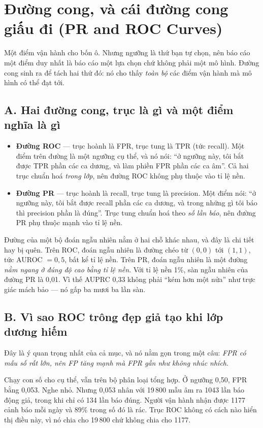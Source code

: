 \documentclass[../../deep_learning.tex]{subfiles}
\begin{document}
\section{Đường cong, và cái đường cong giấu đi (PR and ROC Curves)}
Một điểm vận hành cho bốn ô. Nhưng ngưỡng là thứ bạn tự chọn, nên báo cáo một điểm duy nhất là báo cáo một lựa chọn chứ không phải một mô hình. Đường cong sinh ra để tách hai thứ đó: nó cho thấy \emph{toàn bộ} các điểm vận hành mà mô hình có thể đạt tới.

\subsection{A. Hai đường cong, trục là gì và một điểm nghĩa là gì}
\begin{itemize}
\item \textbf{Đường ROC} --- trục hoành là FPR, trục tung là TPR (tức recall). Một điểm trên đường là một ngưỡng cụ thể, và nó nói: ``ở ngưỡng này, tôi bắt được TPR phần các ca dương, và làm phiền FPR phần các ca âm''. Cả hai trục chuẩn hoá \emph{trong lớp}, nên đường ROC không phụ thuộc vào tỉ lệ nền.
\item \textbf{Đường PR} --- trục hoành là recall, trục tung là precision. Một điểm nói: ``ở ngưỡng này, tôi bắt được recall phần các ca dương, và trong những gì tôi báo thì precision phần là đúng''. Trục tung chuẩn hoá theo \emph{số lần báo}, nên đường PR phụ thuộc mạnh vào tỉ lệ nền.
\end{itemize}

Đường của một bộ đoán ngẫu nhiên nằm ở hai chỗ khác nhau, và đây là chi tiết hay bị quên. Trên ROC, đoán ngẫu nhiên là đường chéo từ \((0,0)\) tới \((1,1)\), tức AUROC \(= 0{,}5\), bất kể tỉ lệ nền. Trên PR, đoán ngẫu nhiên là một đường \emph{nằm ngang ở đúng độ cao bằng tỉ lệ nền}. Với tỉ lệ nền 1\%, sàn ngẫu nhiên của đường PR là 0{,}01. Vì thế AUPRC 0{,}33 không phải ``kém hơn một nửa'' như trực giác mách bảo --- nó gấp ba mươi ba lần sàn.

\subsection{B. Vì sao ROC trông đẹp giả tạo khi lớp dương hiếm}
Đây là ý quan trọng nhất của cả mục, và nó nằm gọn trong một câu: \emph{FPR có mẫu số rất lớn, nên FP tăng mạnh mà FPR gần như không nhúc nhích}.

Chạy con số cho cụ thể, vẫn trên bộ phân loại tổng hợp. Ở ngưỡng 0{,}50, FPR bằng 0{,}053. Nghe nhỏ. Nhưng 0{,}053 nhân với 19\,800 mẫu âm ra 1043 lần báo động giả, trong khi chỉ có 134 lần báo đúng. Người vận hành nhận được 1177 cảnh báo mỗi ngày và 89\% trong số đó là rác. Trục ROC không có cách nào hiển thị điều này, vì nó chia cho 19\,800 chứ không chia cho 1177.
\end{document}
